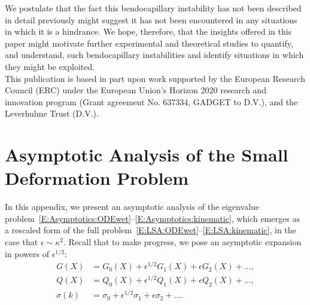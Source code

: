 \documentclass{jfm}
\begin{document}
We postulate that the fact this bendocapillary instability has not been described in detail previously might suggest it has not been encountered in any situations in which it is a hindrance. We hope, therefore, that the insights offered in this paper might motivate further experimental and theoretical studies to quantify, and understand, such bendocapillary instabilities and identify situations in which they might be exploited. \\


This publication is based in part upon work supported by the European Research Council (ERC) under the European Union’s Horizon 2020 research and innovation program (Grant agreement No. 637334, GADGET to D.V.), and the Leverhulme Trust (D.V.). 

\appendix
\section{Asymptotic Analysis of the Small Deformation Problem}\label{A:SmallDeformationAsymptotics}
In this appendix, we present an asymptotic analysis of the eigenvalue problem~\eqref{E:Asymptotics:ODEwet}--\eqref{E:Asymptotics:kinematic}, which emerges as a rescaled form of the full problem~\eqref{E:LSA:ODEwet}--\eqref{E:LSA:kinematic}, in the case that $\epsilon \sim \kappa^2$. Recall that to make progress, we pose an asymptotic expansion in powers of $\epsilon^{1/2}$:
\begin{align}
G(X) &=    G_0(X) + \epsilon^{1/2} G_1(X) + \epsilon G_2(X)+ \dots, \label{A:E:G_expansion}\\
Q(X) &=  Q_0(X) + \epsilon^{1/2} Q_1(X) + \epsilon Q_2(X)+\dots,\label{A:E:Q_expansion}\\
\sigma(k) &= \sigma_0 + \epsilon^{1/2} \sigma_1 + \epsilon \sigma_2+ \dots. \label{A:E:sigma_expansion}
\end{align}
\end{document}
